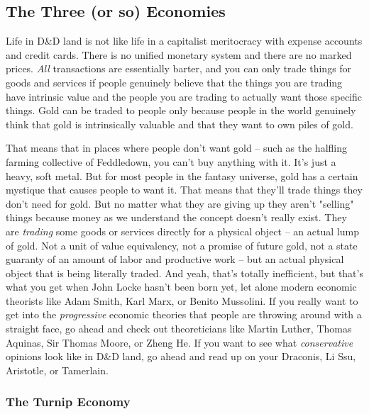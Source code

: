 \subsection{The Three (or so) Economies}
\vspace*{-8pt}

Life in D\&D land is not like life in a capitalist meritocracy with expense accounts and credit cards. There is no unified monetary system and there are no marked prices. \textit{All} transactions are essentially barter, and you can only trade things for goods and services if people genuinely believe that the things you are trading have intrinsic value and the people you are trading to actually want those specific things. Gold can be traded to people only because people in the world genuinely think that gold is intrinsically valuable and that they want to own piles of gold.

That means that in places where people don't want gold -- such as the halfling farming collective of Feddledown, you can't buy anything with it. It's just a heavy, soft metal. But for most people in the fantasy universe, gold has a certain mystique that causes people to want it. That means that they'll trade things they don't need for gold. But no matter what they are giving up they aren't "selling" things because money as we understand the concept doesn't really exist. They are \textit{trading} some goods or services directly for a physical object -- an actual lump of gold. Not a unit of value equivalency, not a promise of future gold, not a state guaranty of an amount of labor and productive work -- but an actual physical object that is being literally traded. And yeah, that's totally inefficient, but that's what you get when John Locke hasn't been born yet, let alone modern economic theorists like Adam Smith, Karl Marx, or Benito Mussolini. If you really want to get into the \textit{progressive} economic theories that people are throwing around with a straight face, go ahead and check out theoreticians like Martin Luther, Thomas Aquinas, Sir Thomas Moore, or Zheng He. If you want to see what \textit{conservative} opinions look like in D\&D land, go ahead and read up on your Draconis, Li Ssu, Aristotle, or Tamerlain.

\subsubsection{The Turnip Economy}
\vspace*{-8pt}

